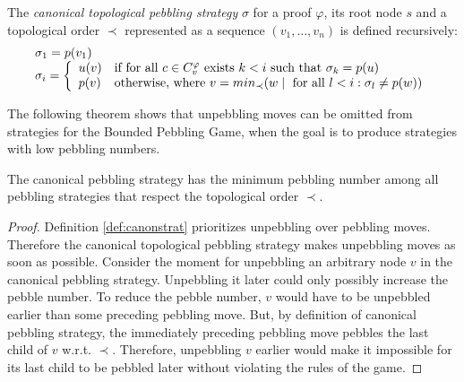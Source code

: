 \begin{definition}
\label{def:canonstrat}
The \emph{canonical topological pebbling strategy} $\sigma$ for a proof $\varphi$, its root node $s$ and a topological order $\prec$ represented as a sequence $(v_1,\dots,v_n)$ is defined recursively:
$$
\begin{array}{l}
\sigma_1 = p(v_1) \\
\sigma_i = 
	\left\{
	\begin{array}{ll}
		u(v) & \text{if for all } c \in C_{v}^{\varphi} \text{ exists } k < i \text { such that } \sigma_k = p(u)\\
		p(v) & \text{otherwise, where } v = min_{\prec}(w \mid \text{ for all } l < i: \sigma_l \neq p(w))
	\end{array}
	\right.
\end{array}
$$
\end{definition}

The following theorem shows that unpebbling moves can be omitted from strategies for the Bounded Pebbling Game, when the goal is to produce strategies with low pebbling numbers.

\begin{theorem}
\label{theorem:canonical}
The canonical pebbling strategy has the minimum pebbling number among all pebbling strategies that respect the topological order $\prec$.
\end{theorem}
\begin{proof}
Definition \ref{def:canonstrat} prioritizes unpebbling over pebbling moves.
Therefore the canonical topological pebbling strategy makes unpebbling moves as soon as possible.
Consider the moment for unpebbling an arbitrary node $v$ in the canonical pebbling strategy. 
Unpebbling it later could only possibly increase the pebble number. 
To reduce the pebble number, $v$ would have to be unpebbled earlier than some preceding pebbling move. 
But, by definition of canonical pebbling strategy, the immediately preceding pebbling move pebbles the last child of $v$ w.r.t. $\prec$. 
Therefore, unpebbling $v$ earlier would make it impossible for its last child to be pebbled later without violating the rules of the game.
\end{proof}

